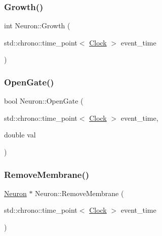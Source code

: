\mbox{\label{classNeuron_a82b34717999a29e5413ebfcfa58c9356}} 
\subsubsection{\texorpdfstring{Growth()}{Growth()}}
{\footnotesize\ttfamily int Neuron\+::\+Growth (\begin{DoxyParamCaption}\item[{std\+::chrono\+::time\+\_\+point$<$ \mbox{\hyperlink{universe_8h_a0ef8d951d1ca5ab3cfaf7ab4c7a6fd80}{Clock}} $>$}]{event\+\_\+time }\end{DoxyParamCaption})}

\mbox{\label{classNeuron_a82d0a4739244d79ff929be01eeb0be28}} 
\subsubsection{\texorpdfstring{Open\+Gate()}{OpenGate()}}
{\footnotesize\ttfamily bool Neuron\+::\+Open\+Gate (\begin{DoxyParamCaption}\item[{std\+::chrono\+::time\+\_\+point$<$ \mbox{\hyperlink{universe_8h_a0ef8d951d1ca5ab3cfaf7ab4c7a6fd80}{Clock}} $>$}]{event\+\_\+time,  }\item[{double}]{val }\end{DoxyParamCaption})}

\mbox{\label{classNeuron_a190ae0628482048bef95c8b318939322}} 
\subsubsection{\texorpdfstring{Remove\+Membrane()}{RemoveMembrane()}}
{\footnotesize\ttfamily \mbox{\hyperlink{classNeuron}{Neuron}} $\ast$ Neuron\+::\+Remove\+Membrane (\begin{DoxyParamCaption}\item[{std\+::chrono\+::time\+\_\+point$<$ \mbox{\hyperlink{universe_8h_a0ef8d951d1ca5ab3cfaf7ab4c7a6fd80}{Clock}} $>$}]{event\+\_\+time }\end{DoxyParamCaption})}

